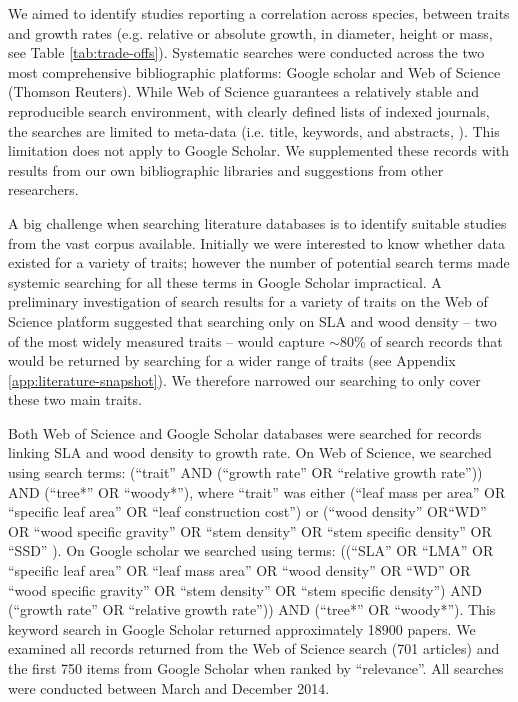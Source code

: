 \documentclass[a4paper,11pt]{article}
\begin{document}
We aimed to identify studies reporting a correlation across species, between traits and growth rates (e.g. relative or absolute growth, in diameter, height or mass, see Table \ref{tab:trade-offs}). Systematic searches were conducted across the two most comprehensive bibliographic platforms: Google scholar and Web of Science (Thomson Reuters). While Web of Science guarantees a relatively stable and reproducible search environment, with clearly defined lists of indexed journals, the searches are limited to meta-data (i.e. title, keywords, and abstracts, \citealt{Beckmann:2012hn}). This limitation does not apply to Google Scholar. We supplemented these records with results from our own bibliographic libraries and suggestions from other researchers.

A big challenge when searching literature databases is to identify suitable studies from the vast corpus available. Initially we were interested to know whether data existed for a variety of traits; however the number of potential search terms made systemic searching for all these terms in Google Scholar impractical. A preliminary investigation of search results for a variety of traits on the Web of Science platform suggested that searching only on SLA and wood density -- two of the most widely measured traits -- would capture $\sim$80\% of search records that would be returned by searching for a wider range of traits (see Appendix \ref{app:literature-snapshot}). We therefore narrowed our searching to only cover these two main traits.

Both Web of Science and Google Scholar databases were searched for records linking SLA and wood density to growth rate. On Web of Science, we searched using  search terms: (``trait'' AND (``growth rate'' OR ``relative growth rate'')) AND (``tree*'' OR ``woody*''), where ``trait'' was either (``leaf mass per area'' OR ``specific leaf area'' OR ``leaf construction cost'') or (``wood density'' OR``WD'' OR ``wood specific gravity'' OR ``stem density'' OR ``stem specific density'' OR ``SSD'' ). On Google scholar we searched using terms: ((``SLA'' OR ``LMA'' OR ``specific leaf area'' OR ``leaf mass area'' OR ``wood density'' OR ``WD'' OR ``wood specific gravity'' OR ``stem density'' OR ``stem specific density'') AND (``growth rate'' OR ``relative growth rate'')) AND (``tree*'' OR ``woody*''). This keyword search in Google Scholar returned approximately 18900 papers. We examined all records returned from the Web of Science search (701 articles) and the first 750 items from Google Scholar when ranked by ``relevance''. All searches were conducted between March and December 2014.
\end{document}
